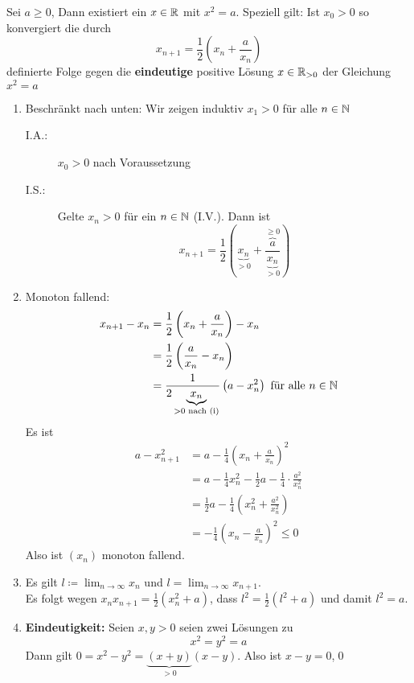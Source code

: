 \documentclass[consecutivenumbering]{gadsescript}
\begin{document}
\begin{subcorollary}
	Sei $ a\geq 0 $, Dann existiert ein $  x \in \mathbb{R} $ mit $ x^2 = a $. Speziell gilt:
	Ist $ x_0 > 0 $ so konvergiert die durch
	\[ x_{n+1} = \frac{1}{2} \left( x_n + \frac{a}{x_n} \right) \]
	definierte Folge gegen die \textbf{eindeutige} positive Lösung $ x \in \mathbb{R}_{>0} $ der Gleichung $ x^2 = a $
	\begin{subproof*}
		\begin{enumerate}[label=(\roman*)]
			\item Beschränkt nach unten: Wir zeigen induktiv $ x_1 > 0 $ für alle $ n \in \mathbb{N} $
				\begin{description}
					\item[I.A.:] $ x_0 > 0 $ nach Voraussetzung
					\item[I.S.:] Gelte $ x_n > 0 $ für ein $ n \in \mathbb{N} $ (I.V.). Dann ist
						\[ x_{n+1} = \frac{1}{2} \left( \underbrace{x_n}_{>0} + \frac{\overbrace{a}^{\geq0}}{\underbrace{x_n}_{>0}} \right) \]
				\end{description}
			\item Monoton fallend: 
				\begin{align*}
					x_{n+1} - x_n &= \frac{1}{2} \left( x_n + \frac{a}{x_n} \right) - x_n\\
					~&= \frac{1}{2} \left( \frac{a}{x_n} - x_n \right)\\
					~&= \frac{1}{2\underbrace{x_n}_{>0 \text{ nach (i)}}} \left( a - x_n^2 \right) \text{ für alle } n \in \mathbb{N}
				\end{align*}
				Es ist
				\begin{align*}
					a- x_{n+1}^{2} &= a - \frac{1}{4} \left( x_n + \frac{a}{x_n} \right)^2\\
					~&= a - \frac{1}{4}x_n^2 - \frac{1}{2} a - \frac{1}{4} \cdot \frac{a^2}{x_n^2}\\
					~&= \frac{1}{2}a - \frac{1}{4}\left(x_n^2 + \frac{a^2}{x_n^2}\right)\\
					~&= - \frac{1}{4} \left( x_n - \frac{a}{x_n} \right)^2 \leq 0
				\end{align*}
				Also ist $(x_n)$ monoton fallend.
			\item Es gilt $ l \coloneqq \lim_{n\to\infty} x_n $ und $ l = \lim_{n\to\infty} x_{n+1} $.\\
				Es folgt wegen $ x_n x_{n+1} = \frac{1}{2} \left( x_n^2 + a \right) $, dass $ l^2 = \frac{1}{2} \left( l^2 + a \right) $ und damit $ l^2 = a $.
			\item \textbf{Eindeutigkeit:} Seien $ x, y > 0 $ seien zwei Lösungen zu
				\[ x^2 = y^2 = a \]
				Dann gilt $ 0 = x^2 - y^2 = \underbrace{(x+y)}_{>0}(x-y) $. Also ist $ x - y = 0 $,\qed
		\end{enumerate}
	\end{subproof*}
\end{subcorollary}
\end{document}
